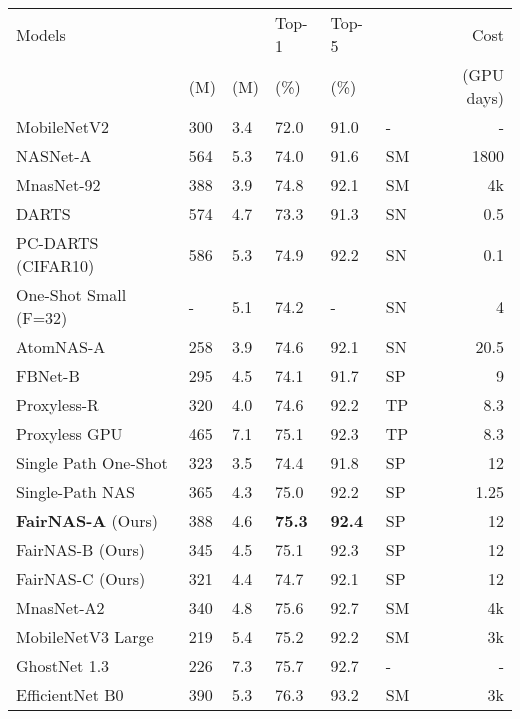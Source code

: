 \documentclass[10pt,twocolumn,letterpaper]{article}
\theoremstyle{definition}
\begin{document}
\begin{table}
	\setlength{\tabcolsep}{2pt}
	\centering
	  \begin{small}
\begin{tabular}{|l|l|l|l|Hl|r|} 	
		\hline 
Models &   &   &  Top-1  &Top-5 &  & Cost \\
			& (M) & (M) & (\%) & (\%)  & & \scriptsize{(GPU days)}  \\
			\hline
MobileNetV2 \cite{sandler2018mobilenetv2}   & 300 & 3.4  & 72.0 & 91.0 & - & - \\ \hline NASNet-A \cite{zoph2017learning}  & 564 & 5.3 &74.0 & 91.6 &  SM &1800 \\ MnasNet-92 \cite{tan2018mnasnet}  & 388 & 3.9  & 74.8 & 92.1 & SM & 4k \\ DARTS  \cite{liu2018darts} & 574 & 4.7& 73.3 & 91.3 & SN & 0.5 \\ PC-DARTS (CIFAR10) \cite{Xu2020PC-DARTS:} & 586 & 5.3 & 74.9 & 92.2 & SN & 0.1 \\
			One-Shot Small (F=32) \cite{bender2018understanding} &- & 5.1 & 74.2 & - & SN & 4 \\
		    AtomNAS-A \cite{Mei2020AtomNAS:} & 258 & 3.9 & 74.6 & 92.1 & SN &20.5 \\
			FBNet-B \cite{wu2018fbnet}   & 295 & 4.5 & 74.1 & 91.7 & SP &9 \\  Proxyless-R \cite{cai2018proxylessnas} & 320 & 4.0  & 74.6 & 92.2 & TP & 8.3 \\ Proxyless GPU \cite{cai2018proxylessnas}  & 465 & 7.1 & 75.1 & 92.3 & TP &  8.3 \\ Single Path One-Shot \cite{guo2019single}  & 323 & 3.5 &  74.4 & 91.8  & SP & 12 \\
			Single-Path NAS \cite{stamoulis2019single} & 365 & 4.3 & 75.0 & 92.2 & SP &1.25 \\ \textbf{FairNAS-A} (Ours)  & 388& 4.6& \textbf{75.3 } & \textbf{92.4} & SP &12 \\
			 FairNAS-B (Ours)   & 345 & 4.5 &  75.1 &  92.3 & SP & 12\\
			 FairNAS-C (Ours)   & 321 & 4.4 &  74.7 & 92.1 & SP & 12 \\
			 \hline MnasNet-A2 \cite{tan2018mnasnet}  & 340 & 4.8 & 75.6 & 92.7 & SM & 4k \\
			 MobileNetV3 Large \cite{howard2019searching} & 219 & 5.4 &75.2 & 92.2 &  SM &3k  \\
			 GhostNet 1.3 \cite{han2020ghostnet} & 226 & 7.3 & 75.7 & 92.7 & - & - \\
			 EfficientNet B0 \cite{tan2019efficientnet} &390 & 5.3  & 76.3 & 93.2 & SM &3k\\

\end{tabular}
\end{small}
\end{table}
\end{document}
